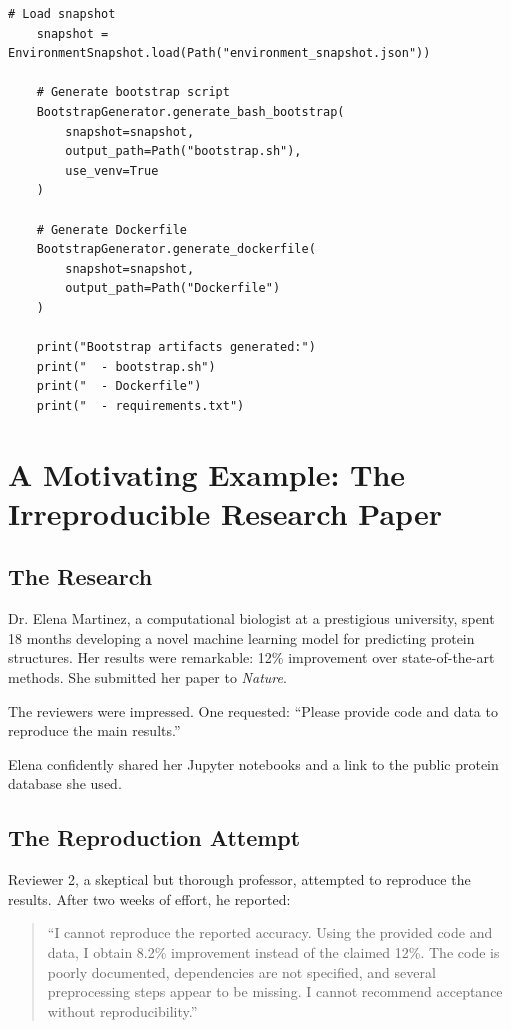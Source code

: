 \begin{lstlisting}[style=python, caption={Environment bootstrap script generator}]
    # Load snapshot
    snapshot = EnvironmentSnapshot.load(Path("environment_snapshot.json"))

    # Generate bootstrap script
    BootstrapGenerator.generate_bash_bootstrap(
        snapshot=snapshot,
        output_path=Path("bootstrap.sh"),
        use_venv=True
    )

    # Generate Dockerfile
    BootstrapGenerator.generate_dockerfile(
        snapshot=snapshot,
        output_path=Path("Dockerfile")
    )

    print("Bootstrap artifacts generated:")
    print("  - bootstrap.sh")
    print("  - Dockerfile")
    print("  - requirements.txt")
\end{lstlisting}

\section{A Motivating Example: The Irreproducible Research Paper}

\subsection{The Research}

Dr. Elena Martinez, a computational biologist at a prestigious university, spent 18 months developing a novel machine learning model for predicting protein structures. Her results were remarkable: 12\% improvement over state-of-the-art methods. She submitted her paper to \textit{Nature}.

The reviewers were impressed. One requested: ``Please provide code and data to reproduce the main results.''

Elena confidently shared her Jupyter notebooks and a link to the public protein database she used.

\subsection{The Reproduction Attempt}

Reviewer 2, a skeptical but thorough professor, attempted to reproduce the results. After two weeks of effort, he reported:

\begin{quote}
``I cannot reproduce the reported accuracy. Using the provided code and data, I obtain 8.2\% improvement instead of the claimed 12\%. The code is poorly documented, dependencies are not specified, and several preprocessing steps appear to be missing. I cannot recommend acceptance without reproducibility.''
\end{quote}

